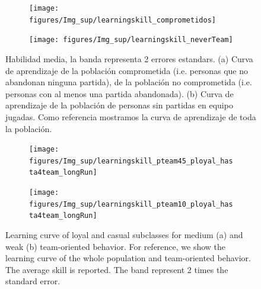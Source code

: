 \documentclass[a4paper,11pt]{book}
\theoremstyle{definition}
\begin{document}
\begin{figure}[H]
\centering
  \begin{subfigure}[b]{0.49\textwidth}
  \texttt{[image: figures/Img\_sup/learningskill\_comprometidos]}
  \caption{}
  \label{learningskill_comprometidos}
  \end{subfigure}
  \begin{subfigure}[b]{0.49\textwidth}
   \texttt{[image: figures/Img\_sup/learningskill\_neverTeam]}
   \label{learningskill_neverTeam}
  \end{subfigure}
  \caption{Habilidad media, la banda representa 2 errores estandars.
  (a) Curva de aprendizaje de la poblaci\'on comprometida (i.e. personas que no abandonan ninguna partida), de la poblaci\'on no comprometida (i.e. personas con al menos una partida abandonada).
  (b) Curva de aprendizaje de la poblaci\'on de personas sin partidas en equipo jugadas.
  Como referencia mostramos la curva de aprendizaje de toda la poblaci\'on.}
\end{figure}




\begin{figure}[H]
  \centering
  \begin{subfigure}[b]{0.49\textwidth}
  \texttt{[image: figures/Img\_sup/learningskill\_pteam45\_ployal\_hasta4team\_longRun]}
  \label{learningskill_pteam45_ployal_hasta4team_longRun}
   \end{subfigure}
  \begin{subfigure}[b]{0.49\textwidth}
  \texttt{[image: figures/Img\_sup/learningskill\_pteam10\_ployal\_hasta4team\_longRun]}
  \label{learningskill_pteam10_ployal_hasta4team_longRun}
  \end{subfigure}
  \caption{Learning curve of loyal and casual subclasses for medium (a) and weak (b) team-oriented behavior. For reference, we show the learning curve of the whole population and team-oriented behavior. The average skill is reported. The band represent 2 times the standard error.}
    \label{learning_curve_ployal_hasta4team_longRun}
\end{figure}
\end{document}
